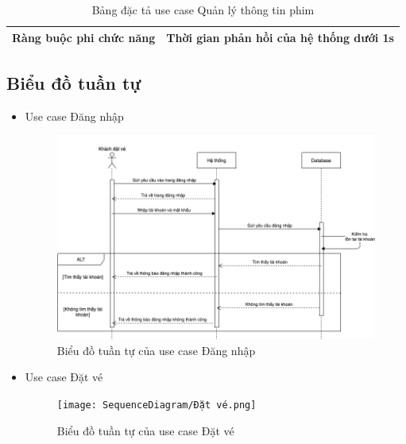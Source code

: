 \documentclass[a4paper, 12pt]{article}
\begin{document}
\begin{itemize}
\begin{table}[H]
\begin{tabular}{|l|l|}
            Ràng buộc phi chức năng & Thời gian phản hồi của hệ thống dưới 1s                                          \\ \hline
            \end{tabular}
            \caption{Bảng đặc tả use case Quản lý thông tin phim}
        \end{table}
    \end{itemize}

    \subsection{Biểu đồ tuần tự}
    \begin{itemize}
        \item Use case Đăng nhập
        \begin{figure}[H]
            \includegraphics[scale = 0.65]{SequenceDiagram/Khách_Đăng nhập.png}
            \caption{Biểu đồ tuần tự của use case Đăng nhập}
        \end{figure}

        \item Use case Đặt vé
        \begin{figure}[H]
            \texttt{[image: SequenceDiagram/Đặt vé.png]}
            \caption{Biểu đồ tuần tự của use case Đặt vé}
        \end{figure}
        

\end{itemize}
\end{document}
